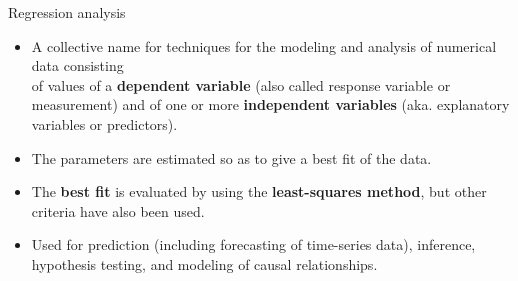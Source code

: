 \documentclass[aspectratio=169,t]{beamer}
\begin{document}
  { 
    \begin{frame}{Regression analysis}
    \begin{itemize}
      \item A collective name for techniques for the modeling and analysis of numerical data consisting \\ of values of a \textbf{{\color{airforceblue}dependent variable}} (also called response variable or measurement) and of one or more \textbf{{\color{airforceblue}independent variables}} (aka. explanatory variables or predictors).
      \item The parameters are estimated so as to give a best fit of the data.
      \item The \textbf{{\color{airforceblue}best fit}} is evaluated by using the \textbf{{\color{airforceblue}least-squares method}}, but other criteria have also been used.
      \item Used for prediction (including forecasting of time-series data), inference, hypothesis testing, and modeling of causal relationships.
    \end{itemize}
    \loadedtable
    \centering
    \end{frame}
  }
\end{document}
